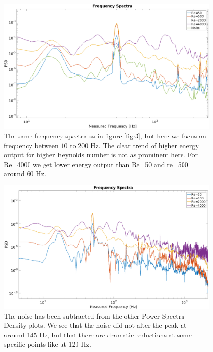 \documentclass[english,a4paper,12pt]{article}
\begin{document}
\begin{figure}[H]
    \centering
    \includegraphics[width=170mm]{FrequencySpectraPlotZoomed.png}
    \caption{The same frequency spectra as in figure \ref{fig:3}, but here we focus on frequency between $10$ to $200$ Hz. The clear trend of higher energy output for higher Reynolds number is not as prominent here. For Re=4000 we get lower energy output than Re=50 and re=500 around $60$ Hz.}
    \label{fig:4}
\end{figure}

\begin{figure}[H]
    \centering
    \includegraphics[width=170mm]{FrequencySpectraPlotWithoutNoise.png}
    \caption{The noise has been subtracted from the other Power Spectra Density plots. We see that the noise did not alter the peak at around 145 Hz, but that there are dramatic reductions at some specific points like at 120 Hz.}
    \label{fig:5}
\end{figure}
\end{document}
